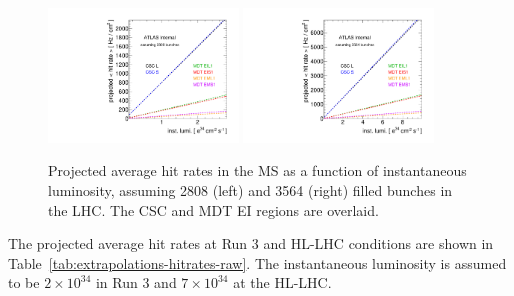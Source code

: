 \begin{figure}
  \begin{center}
    \includegraphics[width=0.45\textwidth]{./figures/extrapolate_vs_lumi_raw_2808.pdf}
    \includegraphics[width=0.45\textwidth]{./figures/extrapolate_vs_lumi_raw_3564.pdf}
    \caption{Projected average hit rates in the MS as a function of instantaneous luminosity, assuming 2808 (left) and 3564 (right) filled bunches in the LHC. The CSC and MDT EI regions are overlaid.}
    \label{fig:extrapolations-hitrates-raw}
  \end{center}
\end{figure}

The projected average hit rates at Run 3 and HL-LHC conditions are shown in Table~\ref{tab:extrapolations-hitrates-raw}. The instantaneous luminosity is assumed to be $2\times10^{34}$ in Run 3 and $7\times10^{34}$ at the HL-LHC. 

\newcommand*{\hspfou}{\hspace*{0.4cm}}

